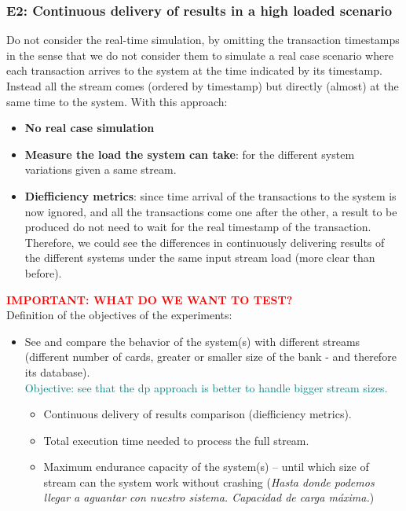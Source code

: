 \subsubsection{E2: Continuous delivery of results in a high loaded scenario}

Do not consider the real-time simulation, by omitting the transaction timestamps in the sense that we do not consider them to simulate a real case scenario where each transaction arrives to the system at the time indicated by its timestamp. 
Instead all the stream comes (ordered by timestamp) but directly (almost) at the same time to the system. With this approach:
\begin{itemize}
  \item \textbf{No real case simulation}
  \item \textbf{Measure the load the system can take}: for the different system variations given a same stream.
  \item \textbf{Diefficiency metrics}: since time arrival of the transactions to the system is now ignored, and all the transactions come one after the other, a result to be produced do not need to wait for the real timestamp of the transaction. Therefore, we could see the differences in continuously delivering results of the different systems under the same input stream load (more clear than before).
\end{itemize}

\begin{tcolorbox}[colframe=red!75]
\textcolor{red}{\textbf{IMPORTANT: WHAT DO WE WANT TO TEST?\\}}
Definition of the objectives of the experiments:
\begin{itemize}
    \item See and compare the behavior of the system(s) with different streams (different number of cards, greater or smaller size of the bank - and therefore its database). \\
    \textcolor{teal}{Objective: see that the dp approach is better to handle bigger stream sizes.}
    \begin{itemize}
        \item Continuous delivery of results comparison (diefficiency metrics).
        \item Total execution time needed to process the full stream.
        \item Maximum endurance capacity of the system(s) -- until which size of stream can the system work without crashing (\textit{Hasta donde podemos llegar a aguantar con nuestro sistema. Capacidad de carga máxima.})
    \end{itemize}
\end{itemize}
\end{tcolorbox}

